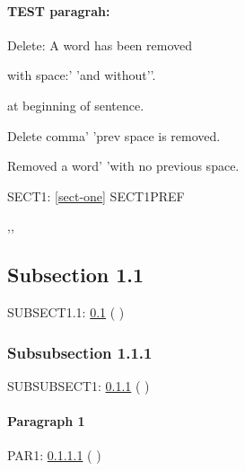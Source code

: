 \documentclass[a4paper,12pt]{report}
\makeatletter
\newcommand{\getCurrentSectionNumber}{%
  \ifnum\c@section=0 %
  \thechapter
  \else
  \ifnum\c@subsection=0 %
  \thesection
  \else
  \ifnum\c@subsubsection=0 %
  \thesubsection
  \else
  \thesubsubsection
  \fi
  \fi
  \fi
}
\makeatother
\begin{document}
 


\paragraph{TEST paragrah:}

Delete: A word has been removed

with space:'  'and without''.

  at beginning of sentence.

Delete comma'\erratumDelete{,} 'prev space is removed.

Removed a word' 'with no previous space.



SECT1: \cref{sect-one}
SECT1PREF 


,,


\subsection{Subsection 1.1}\label{subsect-one}



SUBSECT1.1: \cref{subsect-one} (\getCurrentSectionNumber)





\subsubsection{Subsubsection 1.1.1}\label{subsubsect-one}


SUBSUBSECT1: \cref{subsubsect-one} (\getCurrentSectionNumber)

\paragraph{Paragraph 1}\label{par-one}


PAR1: \cref{par-one}  (\getCurrentSectionNumber)
\end{document}
